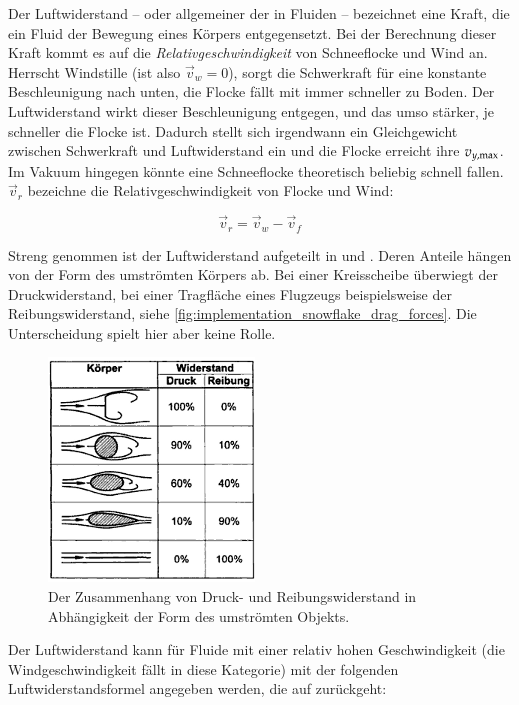 Der Luftwiderstand -- oder allgemeiner der
 in Fluiden -- bezeichnet eine
Kraft, die ein Fluid der Bewegung eines Körpers entgegensetzt. Bei der
Berechnung dieser Kraft kommt es auf die \emph{Relativgeschwindigkeit}
von Schneeflocke und Wind an. Herrscht Windstille (ist also $\vec{v}_w
= 0$), sorgt die Schwerkraft für eine konstante Beschleunigung nach
unten, die Flocke fällt mit immer schneller zu Boden. Der
Luftwiderstand wirkt dieser Beschleunigung entgegen, und das umso
stärker, je schneller die Flocke ist. Dadurch stellt sich irgendwann
ein Gleichgewicht zwischen Schwerkraft und Luftwiderstand ein und die
Flocke erreicht ihre 
$v_{y,\textnormal{max}}$. Im Vakuum hingegen könnte eine
Schneeflocke theoretisch beliebig schnell fallen. $\vec{v}_r$ bezeichne die Relativgeschwindigkeit von Flocke und Wind:

\begin{equation}
\vec{v}_r = \vec{v}_w - \vec{v}_f
\end{equation}

Streng genommen ist der Luftwiderstand aufgeteilt in
 und
. Deren Anteile hängen von der Form
des umströmten Körpers ab. Bei einer Kreisscheibe überwiegt der
Druckwiderstand, bei einer Tragfläche eines Flugzeugs beispielsweise
der Reibungswiderstand, siehe
\autoref{fig:implementation_snowflake_drag_forces}. Die Unterscheidung
spielt hier aber keine Rolle.

\begin{figure}[ht]
    \centering
    \includegraphics{images/drag_forces}
    \caption{Der Zusammenhang von Druck- und Reibungswiderstand in Abhängigkeit der Form des umströmten Objekts.}
    \label{fig:implementation_snowflake_drag_forces}
\end{figure}

Der Luftwiderstand kann für Fluide mit einer relativ hohen
Geschwindigkeit (die Windgeschwindigkeit fällt in diese Kategorie) mit
der folgenden Luftwiderstandsformel angegeben werden, die auf 
zurückgeht:

